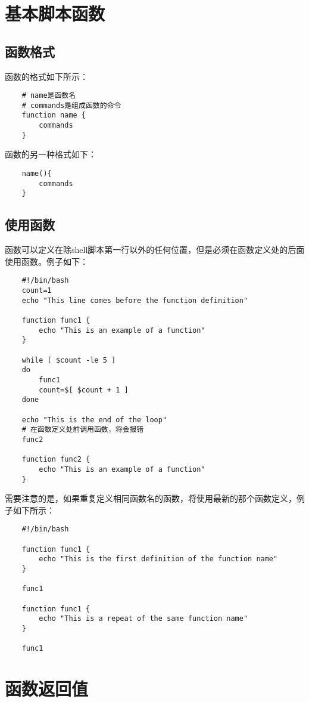 \documentclass[a4paper,left=2.5cm,right=2.5cm,11pt]{article}
\begin{document}
\tableofcontents

\clearpage

\section{基本脚本函数}
\subsection{函数格式}
	函数的格式如下所示：
	\begin{lstlisting}
	# name是函数名
	# commands是组成函数的命令
	function name {
		commands
	}
	\end{lstlisting}

	函数的另一种格式如下：
	\begin{lstlisting}
	name(){
		commands
	}
	\end{lstlisting}

\subsection{使用函数}
	函数可以定义在除shell脚本第一行以外的任何位置，但是必须在函数定义处的后面使用函数。例子如下：
	\begin{lstlisting}
	#!/bin/bash
	count=1
	echo "This line comes before the function definition"

	function func1 {
		echo "This is an example of a function"
	}

	while [ $count -le 5 ]
	do
		func1
		count=$[ $count + 1 ]
	done

	echo "This is the end of the loop"
	# 在函数定义处前调用函数，将会报错
	func2
	
	function func2 {
		echo "This is an example of a function"
	}
	\end{lstlisting}

	需要注意的是，如果重复定义相同函数名的函数，将使用最新的那个函数定义，例子如下所示：
	\begin{lstlisting}
	#!/bin/bash

	function func1 {
		echo "This is the first definition of the function name"
	}

	func1

	function func1 {
		echo "This is a repeat of the same function name"
	}

	func1
	\end{lstlisting}

\section{函数返回值}
\end{document}
